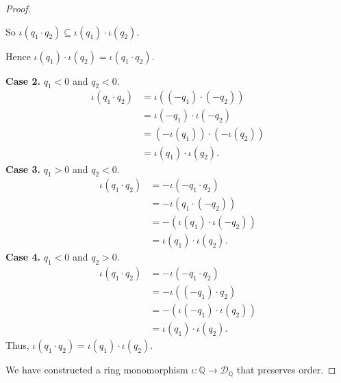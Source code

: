 \begin{proof}
\begin{itemize}
\begin{itemize}
                        So $\iota(q_{1}\cdot q_{2})\subseteq\iota(q_{1})\cdot\iota(q_{2})$.

                        Hence $\iota(q_{1})\cdot\iota(q_{2}) = \iota(q_{1}\cdot q_{2})$.

                        \textbf{Case 2.} $q_{1} < 0$ and $q_{2} < 0$.
                        \begin{align*}
                            \iota(q_{1}\cdot q_{2}) & = \iota((-q_{1})\cdot (-q_{2}))        \\
                                                    & = \iota(-q_{1})\cdot\iota(-q_{2})      \\
                                                    & = (-\iota(q_{1}))\cdot (-\iota(q_{2})) \\
                                                    & = \iota(q_{1})\cdot\iota(q_{2}).
                        \end{align*}
                        \textbf{Case 3.} $q_{1} > 0$ and $q_{2} < 0$.
                        \begin{align*}
                            \iota(q_{1}\cdot q_{2}) & = -\iota(-q_{1}\cdot q_{2})         \\
                                                    & = -\iota(q_{1}\cdot (-q_{2}))       \\
                                                    & = -(\iota(q_{1})\cdot\iota(-q_{2})) \\
                                                    & = \iota(q_{1})\cdot\iota(q_{2}).
                        \end{align*}
                        \textbf{Case 4.} $q_{1} < 0$ and $q_{2} > 0$.
                        \begin{align*}
                            \iota(q_{1}\cdot q_{2}) & = -\iota(-q_{1}\cdot q_{2})         \\
                                                    & = -\iota((-q_{1})\cdot q_{2})       \\
                                                    & = -(\iota(-q_{1})\cdot\iota(q_{2})) \\
                                                    & = \iota(q_{1})\cdot\iota(q_{2}).
                        \end{align*}
                        Thus, $\iota(q_{1}\cdot q_{2}) = \iota(q_{1})\cdot\iota(q_{2})$.
              \end{itemize}
    \end{itemize}

    We have constructed a ring monomorphism $\iota:\mathbb{Q}\to\mathscr{D}_{\mathbb{Q}}$ that preserves order.
\end{proof}

